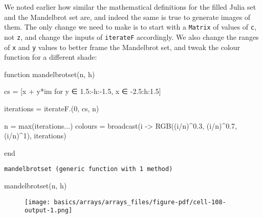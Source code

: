\documentclass[
  letterpaper,
  DIV=11,
  numbers=noendperiod]{scrreprt}
\newenvironment{Shaded}{\begin{snugshade}}{\end{snugshade}}
\newcommand{\ConstantTok}[1]{\textcolor[rgb]{0.56,0.35,0.01}{#1}}
\newcommand{\FloatTok}[1]{\textcolor[rgb]{0.68,0.00,0.00}{#1}}
\newcommand{\FunctionTok}[1]{\textcolor[rgb]{0.28,0.35,0.67}{#1}}
\newcommand{\KeywordTok}[1]{\textcolor[rgb]{0.00,0.23,0.31}{#1}}
\newcommand{\NormalTok}[1]{\textcolor[rgb]{0.00,0.23,0.31}{#1}}
\newcommand{\OperatorTok}[1]{\textcolor[rgb]{0.37,0.37,0.37}{#1}}
\begin{document}
We noted earlier how similar the mathematical definitions for the filled
Julia set and the Mandelbrot set are, and indeed the same is true to
generate images of them. The only change we need to make is to start
with a \texttt{Matrix} of values of \texttt{c}, not \texttt{z}, and
change the inputs of \texttt{iterateF} accordingly. We also change the
ranges of \texttt{x} and \texttt{y} values to better frame the
Mandelbrot set, and tweak the colour function for a different shade:

\begin{Shaded}
\begin{Highlighting}[]
\KeywordTok{function} \FunctionTok{mandelbrotset}\NormalTok{(n, h)}

\NormalTok{    cs }\OperatorTok{=}\NormalTok{ [x }\OperatorTok{+}\NormalTok{ y}\OperatorTok{*}\ConstantTok{im}\NormalTok{ for y }\OperatorTok{∈} \FloatTok{1.5}\OperatorTok{:{-}}\NormalTok{h}\OperatorTok{:{-}}\FloatTok{1.5}\NormalTok{, x }\OperatorTok{∈} \OperatorTok{{-}}\FloatTok{2.5}\OperatorTok{:}\NormalTok{h}\OperatorTok{:}\FloatTok{1.5}\NormalTok{]}

\NormalTok{    iterations }\OperatorTok{=} \FunctionTok{iterateF}\NormalTok{.(}\FloatTok{0}\NormalTok{, cs, n)}

\NormalTok{    n }\OperatorTok{=} \FunctionTok{max}\NormalTok{(iterations}\OperatorTok{...}\NormalTok{)}
\NormalTok{    colours }\OperatorTok{=} \FunctionTok{broadcast}\NormalTok{(i }\OperatorTok{{-}\textgreater{}} \FunctionTok{RGB}\NormalTok{((i}\OperatorTok{/}\NormalTok{n)}\OperatorTok{\^{}}\FloatTok{0.3}\NormalTok{, (i}\OperatorTok{/}\NormalTok{n)}\OperatorTok{\^{}}\FloatTok{0.7}\NormalTok{, (i}\OperatorTok{/}\NormalTok{n)}\OperatorTok{\^{}}\FloatTok{1}\NormalTok{), iterations)}
    
\KeywordTok{end}
\end{Highlighting}
\end{Shaded}

\begin{verbatim}
mandelbrotset (generic function with 1 method)
\end{verbatim}

\begin{Shaded}
\begin{Highlighting}[]
\FunctionTok{mandelbrotset}\NormalTok{(n, h)}
\end{Highlighting}
\end{Shaded}

\begin{figure}[H]

{\centering \texttt{[image: basics/arrays/arrays\_files/figure-pdf/cell-108-output-1.png]}

}

\end{figure}
\end{document}
